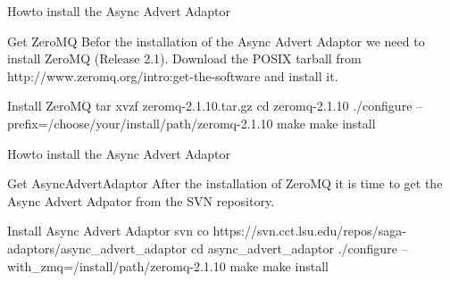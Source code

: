 \documentclass{beamer}
\begin{document}
    \begin{frame}{Howto install the Async Advert Adaptor}
      \begin{block}{Get ZeroMQ}
        Befor the installation of the Async Advert Adaptor we need to install ZeroMQ (Release 2.1). 
        Download the POSIX tarball from http://www.zeromq.org/intro:get-the-software and install it.
      \end{block}
      
      \begin{exampleblock}{Install ZeroMQ}
         tar xvzf zeromq-2.1.10.tar.gz \newline
         cd zeromq-2.1.10 \newline
         ./configure --prefix=/choose/your/install/path/zeromq-2.1.10 \newline
         make \newline
         make install
      \end{exampleblock}
    \end{frame}
    
    \begin{frame}{Howto install the Async Advert Adaptor}
      \begin{block}{Get AsyncAdvertAdaptor}
        After the installation of ZeroMQ it is time to get the Async Advert Adpator
        from the SVN repository. 
      \end{block}
      
      \begin{exampleblock}{Install Async Advert Adaptor}
        svn co https://svn.cct.lsu.edu/repos/saga-adaptors/async\_advert\_adaptor \newline
        cd async\_advert\_adaptor \newline
        ./configure --with\_zmq=/install/path/zeromq-2.1.10 \newline
        make \newline
        make install
      \end{exampleblock}
    \end{frame}
    
\end{document}
